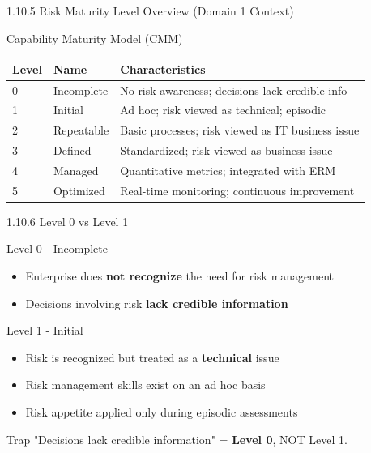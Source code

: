 \documentclass{beamer}
\begin{document}
	\begin{frame}{1.10.5 Risk Maturity Level Overview (Domain 1 Context)}
		\begin{block}{Capability Maturity Model (CMM)}
			\begin{tabular}{|p{1.2cm}|p{3cm}|p{6.5cm}|}
				\hline
				\textbf{Level} & \textbf{Name} & \textbf{Characteristics} \\
				\hline
				0 & Incomplete & No risk awareness; decisions lack credible info \\
				\hline
				1 & Initial & Ad hoc; risk viewed as technical; episodic \\
				\hline
				2 & Repeatable & Basic processes; risk viewed as IT business issue \\
				\hline
				3 & Defined & Standardized; risk viewed as business issue \\
				\hline
				4 & Managed & Quantitative metrics; integrated with ERM \\
				\hline
				5 & Optimized & Real-time monitoring; continuous improvement \\
				\hline
			\end{tabular}
		\end{block}
	\end{frame}
	
	\begin{frame}{1.10.6 Level 0 vs Level 1}
		\begin{block}{Level 0 - Incomplete}
			\begin{itemize}
				\item Enterprise does \textbf{not recognize} the need for risk management
				\item Decisions involving risk \textbf{lack credible information}
			\end{itemize}
		\end{block}
		\begin{block}{Level 1 - Initial}
			\begin{itemize}
				\item Risk is recognized but treated as a \textbf{technical} issue
				\item Risk management skills exist on an ad hoc basis
				\item Risk appetite applied only during episodic assessments
			\end{itemize}
		\end{block}
		\begin{alertblock}{Trap}
			"Decisions lack credible information" = \textbf{Level 0}, NOT Level 1.
		\end{alertblock}
	\end{frame}
	
\end{document}
